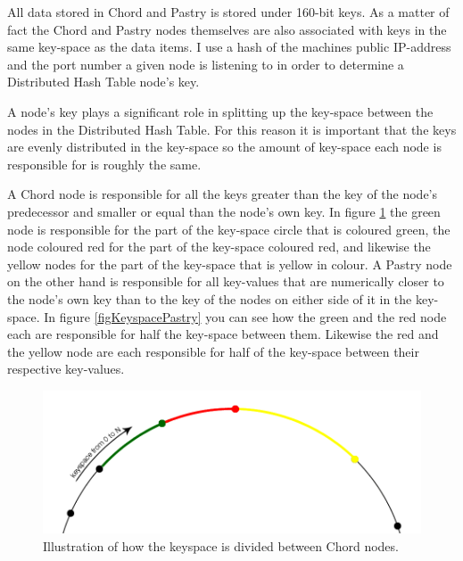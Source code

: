 All data stored in Chord and Pastry is stored under 160-bit keys. As a matter of fact the Chord and Pastry nodes themselves are also associated with keys in the same key-space as the data items. I use a hash of the machines public IP-address and the port number a given node is listening to in order to determine a Distributed Hash Table node's key.

A node's key plays a significant role in splitting up the key-space between the nodes in the Distributed Hash Table. For this reason it is important that the keys are evenly distributed in the key-space so the amount of key-space each node is responsible for is roughly the same.

A Chord node is responsible for all the keys greater than the key of the node's predecessor and smaller or equal than the node's own key. In figure \ref{figKeyspaceChord} the green node is responsible for the part of the key-space circle that is coloured green, the node coloured red for the part of the key-space coloured red, and likewise the yellow nodes for the part of the key-space that is yellow in colour.
A Pastry node on the other hand is responsible for all key-values that are numerically closer to the node's own key than to the key of the nodes on either side of it in the key-space. In figure \ref{figKeyspacePastry} you can see how the green and the red node each are responsible for half the key-space between them. Likewise the red and the yellow node are each responsible for half of the key-space between their respective key-values.

\begin{figure}[!htb]
\begin{center}
	\includegraphics[width=0.9\linewidth]{illustrations/ChordKeySpace.png}
  \caption{Illustration of how the keyspace is divided between Chord nodes.}
  \label{figKeyspaceChord}
\end{center}
\end{figure}

